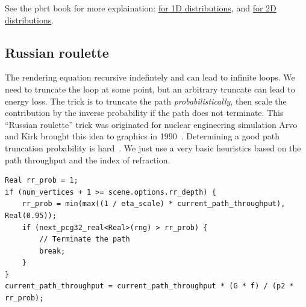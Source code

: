 \documentclass{article}
\begin{document}
See the pbrt book for more explaination: \href{https://pbr-book.org/3ed-2018/Monte_Carlo_Integration/Sampling_Random_Variables#x1-Example:Piecewise-Constant1DFunctions}{for 1D distributions}, and \href{https://www.pbr-book.org/3ed-2018/Monte_Carlo_Integration/2D_Sampling_with_Multidimensional_Transformations#Piecewise-Constant2DDistributions}{for 2D distributions}.

\subsection{Russian roulette}

The rendering equation recursive indefintely and can lead to infinite loops. We need to truncate the loop at some point, but an arbitrary truncate can lead to energy loss. The trick is to truncate the path \emph{probabilistically}, then scale the contribution by the inverse probability if the path does not terminate. This ``Russian roulette'' trick was originated for nuclear engineering simulation Arvo and Kirk brought this idea to graphics in 1990~\cite{Arvo:1990:PTI}. Determining a good path truncation probability is hard~\cite{Vorba:2016:ARR}. We just use a very basic heuristics based on the path throughput and the index of refraction.

\begin{lstlisting}
Real rr_prob = 1;
if (num_vertices + 1 >= scene.options.rr_depth) {
    rr_prob = min(max((1 / eta_scale) * current_path_throughput), Real(0.95));
    if (next_pcg32_real<Real>(rng) > rr_prob) {
        // Terminate the path
        break;
    }
}
current_path_throughput = current_path_throughput * (G * f) / (p2 * rr_prob);
\end{lstlisting}

\end{document}
